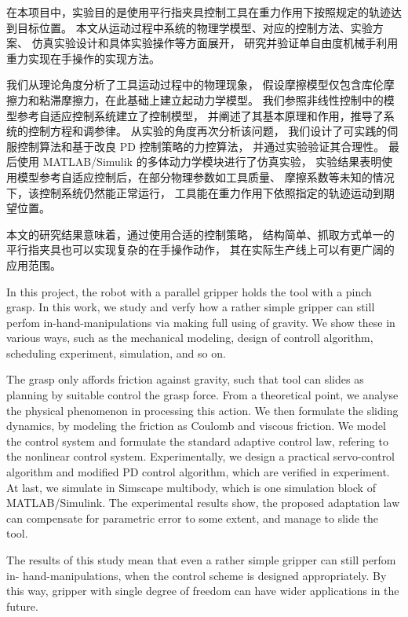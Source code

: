 
\abstract
在本项目中，实验目的是使用平行指夹具控制工具在重力作用下按照规定的轨迹达到目标位置。
本文从运动过程中系统的物理学模型、对应的控制方法、实验方案、
仿真实验设计和具体实验操作等方面展开，
研究并验证单自由度机械手利用重力实现在手操作的实现方法。

我们从理论角度分析了工具运动过程中的物理现象，
假设摩擦模型仅包含库伦摩擦力和粘滞摩擦力，在此基础上建立起动力学模型。
我们参照非线性控制中的模型参考自适应控制系统建立了控制模型，
并阐述了其基本原理和作用，推导了系统的控制方程和调参律。
从实验的角度再次分析该问题，
我们设计了可实践的伺服控制算法和基于改良 PD 控制策略的力控算法，
并通过实验验证其合理性。
最后使用 MATLAB/Simulik 的多体动力学模块进行了仿真实验，
实验结果表明使用模型参考自适应控制后，在部分物理参数如工具质量、
摩擦系数等未知的情况下，该控制系统仍然能正常运行，
工具能在重力作用下依照指定的轨迹运动到期望位置。

本文的研究结果意味着，通过使用合适的控制策略，
结构简单、抓取方式单一的平行指夹具也可以实现复杂的在手操作动作，
其在实际生产线上可以有更广阔的应用范围。


\enabstract
In this project, the robot with a parallel gripper holds the tool with a pinch grasp.
In this work, we study and verfy how a rather simple gripper can still perfom in-hand-manipulations via making full using of gravity.
We show these in various ways, such as the mechanical modeling,
design of controll algorithm, scheduling experiment, simulation, and so on.

The grasp only affords friction against gravity,
such that tool can slides as planning by suitable control the grasp force.
From a theoretical point, we analyse the physical phenomenon in processing this action.
We then formulate the sliding dynamics,
by modeling the friction as Coulomb and viscous friction.
We model the control system and formulate the standard adaptive control law,
refering to the nonlinear control system.
Experimentally, we design a practical servo-control algorithm and
modified PD control algorithm, which are verified in experiment.
At last, we simulate in Simscape multibody,
which is one simulation block of MATLAB/Simulink.
The experimental results show, the proposed adaptation law can
compensate for parametric error to some extent, and manage to slide the tool.

The results of this study mean that even a rather simple gripper can still perfom in- hand-manipulations,
when the control scheme is designed appropriately.
By this way, gripper with single degree of freedom can have wider applications in the future.


